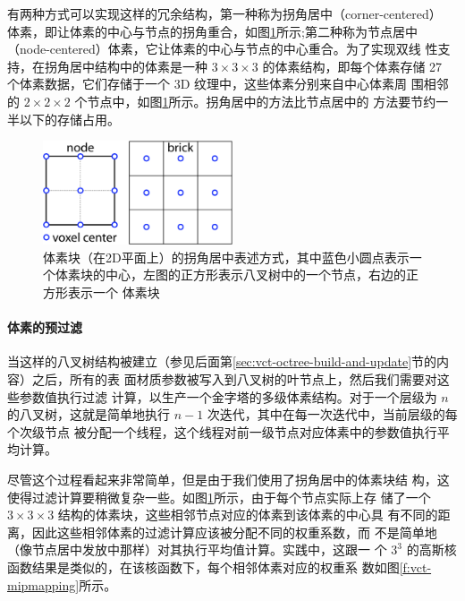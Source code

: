 有两种方式可以实现这样的冗余结构，第一种称为拐角居中（corner-centered） 体素，即让体素的中心与节点的拐角重合，如图\ref{f:vct-13-11}所示;第二种称为节点居中（node-centered）体素，它让体素的中心与节点的中心重合。为了实现双线 性支持，在拐角居中结构中的体素是一种 $3\times  3\times  3$ 的体素结构，即每个体素存储 27 个体素数据，它们存储于一个 3D 纹理中，这些体素分别来自中心体素周 围相邻的 $2\times 2\times 2$ 个节点中，如图\ref{f:vct-13-11}所示。拐角居中的方法比节点居中的 方法要节约一半以下的存储占用。

\begin{figure}
	\sidecaption
	\includegraphics[width=0.5\textwidth]{figures/vct/vct-13-11}
	\caption{体素块（在2D平面上）的拐角居中表述方式，其中蓝色小圆点表示一 个体素块的中心，左图的正方形表示八叉树中的一个节点，右边的正方形表示一个 体素块}
	\label{f:vct-13-11}
\end{figure}



\paragraph{体素的预过滤}
当这样的八叉树结构被建立（参见后面第\ref{sec:vct-octree-build-and-update}节的内容）之后，所有的表 面材质参数被写入到八叉树的叶节点上，然后我们需要对这些参数值执行过滤 计算，以生产一个金字塔的多级体素结构。对于一个层级为 $n$ 的八叉树，这就是简单地执行 $n − 1$ 次迭代，其中在每一次迭代中，当前层级的每个次级节点 被分配一个线程，这个线程对前一级节点对应体素中的参数值执行平均计算。

尽管这个过程看起来非常简单，但是由于我们使用了拐角居中的体素块结 构，这使得过滤计算要稍微复杂一些。如图\ref{f:vct-13-11}所示，由于每个节点实际上存 储了一个 $3\times  3\times  3$ 结构的体素块，这些相邻节点对应的体素到该体素的中心具 有不同的距离，因此这些相邻体素的过滤计算应该被分配不同的权重系数，而 不是简单地（像节点居中发放中那样）对其执行平均值计算。实践中，这跟一 个 $3^{3}$ 的高斯核函数结果是类似的，在该核函数下，每个相邻体素对应的权重系 数如图\ref{f:vct-mipmapping}所示。

